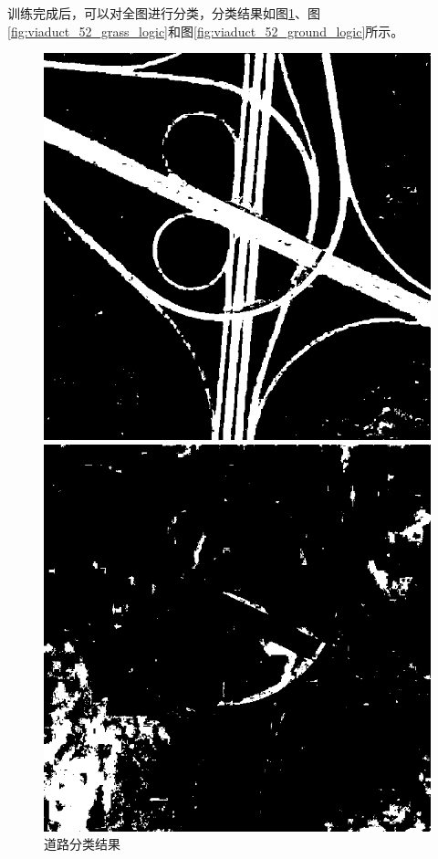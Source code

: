 训练完成后，可以对全图进行分类，分类结果如图\ref{fig:viaduct_52_road_logic}、图\ref{fig:viaduct_52_grass_logic}和图\ref{fig:viaduct_52_ground_logic}所示。
\begin{figure}[H]
	\centering
	\begin{minipage}{0.3\linewidth}
		\includegraphics[width=\linewidth]{figure/viaduct_52_Road_Logic_P.png}
		\caption{道路分类结果}
		\label{fig:viaduct_52_road_logic}
	\end{minipage}
	\begin{minipage}{0.3\linewidth}
		\includegraphics[width=\linewidth]{figure/viaduct_52_Grass_Logic_P.png}

\end{minipage}
\end{figure}
